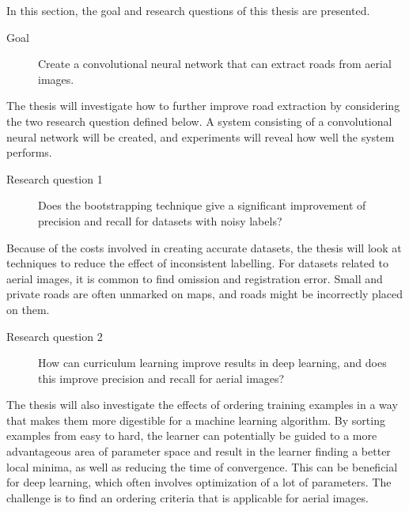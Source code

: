 In this section, the goal and research questions of this thesis are presented.

\begin{description}
\item[Goal] Create a convolutional neural network that can extract roads from aerial images.
\end{description}

The thesis will investigate how to further improve road extraction by considering the two research question defined below. A system consisting of a convolutional neural network will be created, and experiments will reveal how well the system performs.

\begin{description}
\item[Research question 1] Does the bootstrapping technique give a significant improvement of precision and recall for datasets with noisy labels?
\end{description}

Because of the costs involved in creating accurate datasets, the thesis will look at techniques to reduce the effect of inconsistent labelling. For datasets related to aerial images, it is common to find omission and registration error. Small and private roads are often unmarked on maps, and roads might be incorrectly placed on them.


\begin{description}
\item[Research question 2]  How can curriculum learning improve results in deep learning, and does this improve precision and recall for aerial images?
\end{description}

The thesis will also investigate the effects of ordering training examples in a way that makes them more digestible for a machine learning algorithm. By sorting examples from easy to hard, the learner can potentially be guided to a more advantageous area of parameter space and result in the learner finding a better local minima, as well as reducing the time of convergence. This can be beneficial for deep learning, which often involves optimization of a lot of parameters. The challenge is to find an ordering criteria that is applicable for aerial images. 
